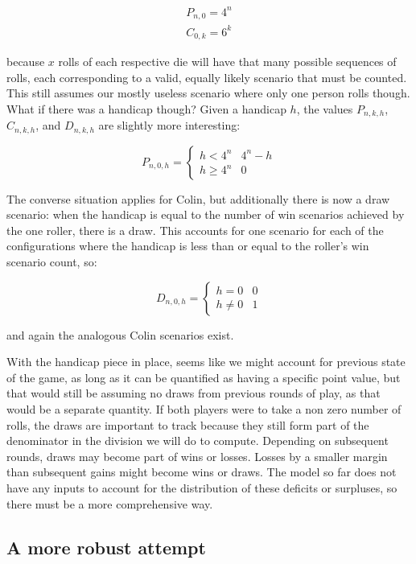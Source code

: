 \documentclass{article}
\begin{document}
\begin{align*}
    P_{n,0} = 4^n \\
    C_{0,k} = 6^k
\end{align*}

because $x$ rolls of each respective die will have that many possible sequences of rolls, each corresponding to a valid, equally likely scenario that must be counted.  This still assumes our mostly useless scenario where only one person rolls though.  What if there was a handicap though?  Given a handicap $h$, the values $P_{n,k,h}$, $C_{n,k,h}$, and $D_{n,k,h}$ are slightly more interesting:

\[
    P_{n,0,h} =
    \begin{cases}
        h < 4^n & 4^n - h \\
        h \geq 4^n & 0
    \end{cases}
\]

The converse situation applies for Colin, but additionally there is now a draw scenario: when the handicap is equal to the number of win scenarios achieved by the one roller, there is a draw.  This accounts for one scenario for each of the configurations where the handicap is less than or equal to the roller's win scenario count, so:

\[
    D_{n,0,h} =
    \begin{cases}
        h = 0 & 0 \\
        h \neq 0 & 1
    \end{cases}
\]

and again the analogous Colin scenarios exist.

With the handicap piece in place, seems like we might account for previous state of the game, as long as it can be quantified as having a specific point value, but that would still be assuming no draws from previous rounds of play, as that would be a separate quantity.  If both players were to take a non zero number of rolls, the draws are important to track because they still form part of the denominator in the division we will do to compute.  Depending on subsequent rounds, draws may become part of wins or losses.  Losses by a smaller margin than subsequent gains might become wins or draws.   The model so far does not have any inputs to account for the distribution of these deficits or surpluses, so there must be a more comprehensive way.

\subsection*{A more robust attempt}
\end{document}

